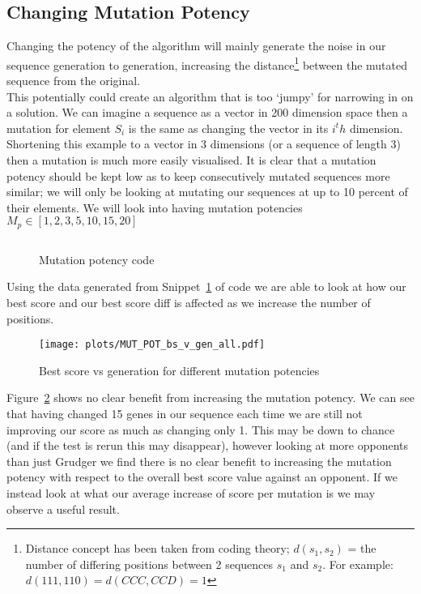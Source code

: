 \subsection{Changing Mutation Potency}\label{subsec:changingMutationPotency}
Changing the potency of the algorithm will mainly generate the noise in our sequence generation to generation, increasing the distance\footnote{Distance concept has been taken from coding theory; \(d(s_1,s_2)\) = the number of differing positions between 2 sequences \(s_1\) and \(s_2\).
For example: \(d(111,110) = d(CCC,CCD) = 1 \)} between the mutated sequence from the original.\\

This potentially could create an algorithm that is too `jumpy' for narrowing in on a solution.
We can imagine a sequence as a vector in 200 dimension space then a mutation for element \(S_i\) is the same as changing the vector in its \(i^th\) dimension.
Shortening this example to a vector in 3 dimensions (or a sequence of length 3) then a mutation is much more easily visualised.
It is clear that a mutation potency should be kept low as to keep consecutively mutated sequences more similar;
we will only be looking at mutating our sequences at up to 10 percent of their elements.
We will look into having mutation potencies \(M_p \in [1,2,3,5,10,15,20]\)\\

\begin{figure}
    \inputminted{python}{code_snippets/mutationPotencyChecker.py}
    \caption{Mutation potency code}\label{code:mutationPotencyChecker}
\end{figure}

Using the data generated from Snippet~\ref{code:mutationPotencyChecker} of code we are able to look at how our best score and our best score diff is affected as we increase the number of positions.\\

\begin{figure}[h]
    \texttt{[image: plots/MUT\_POT\_bs\_v\_gen\_all.pdf]}
    \caption{Best score vs generation for different mutation potencies}\label{fig:MUT-POT-bs-v-gen-all}
\end{figure}

Figure~\ref{fig:MUT-POT-bs-v-gen-all} shows no clear benefit from increasing the mutation potency.
We can see that having changed 15 genes in our sequence each time we are still not improving our score as much as changing only 1.
This may be down to chance (and if the test is rerun this may disappear), however looking at more opponents than just Grudger we find there is no clear benefit to increasing the mutation potency with respect to the overall best score value against an opponent.
If we instead look at what our average increase of score per mutation is we may observe a useful result.\\

